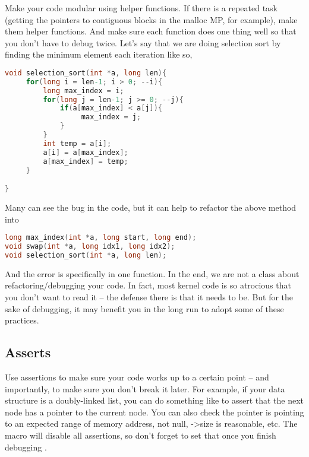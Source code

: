 Make your code modular using helper functions. If there is a repeated task (getting the pointers to contiguous blocks in the malloc MP, for example), make them helper functions.
And make sure each function does one thing well so that you don't have to debug twice.
Let's say that we are doing selection sort by finding the minimum element each iteration like so,

\begin{lstlisting}[language=C]
void selection_sort(int *a, long len){
     for(long i = len-1; i > 0; --i){
         long max_index = i;
         for(long j = len-1; j >= 0; --j){
             if(a[max_index] < a[j]){
                  max_index = j;
             }
         }
         int temp = a[i];
         a[i] = a[max_index];
         a[max_index] = temp;
     }

}
\end{lstlisting}

Many can see the bug in the code, but it can help to refactor the above method into

\begin{lstlisting}[language=C]
long max_index(int *a, long start, long end);
void swap(int *a, long idx1, long idx2);
void selection_sort(int *a, long len);
\end{lstlisting}

And the error is specifically in one function.
In the end, we are not a class about refactoring/debugging your code.
In fact, most kernel code is so atrocious that you don't want to read it -- the defense there is that it needs to be.
But for the sake of debugging, it may benefit you in the long run to adopt some of these practices.

\subsection{Asserts}

Use assertions to make sure your code works up to a certain point -- and importantly, to make sure you don't break it later.
For example, if your data structure is a doubly-linked list, you can do something like  to assert that the next node has a pointer to the current node.
You can also check the pointer is pointing to an expected range of memory address, not null, -\textgreater{}size is reasonable, etc.
The  macro will disable all assertions, so don't forget to set that once you finish debugging \cite{cplusplus_assert}.

